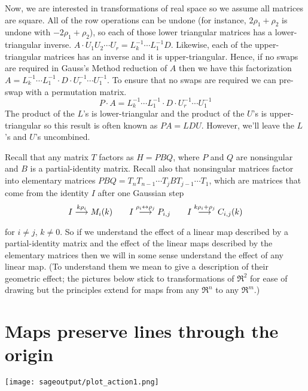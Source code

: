 Now, we are interested in transformations of real space so we assume all
matrices are square.
All of the row operations can be undone (for instance, $2\rho_1+\rho_2$
is undone with $-2\rho_1+\rho_2$), so each of those lower triangular matrices
has a lower-triangular inverse.
$A\cdot U_1U_2\cdots U_r = L_k^{-1}\cdots L_1^{-1}D$. 
Likewise, each of the upper-triangular matrices has an inverse and it is
upper-triangular.
Hence, if no swaps are required in Gauss's Method reduction of $A$ then we have
this factorization 
$A = L_k^{-1}\cdots L_1^{-1}\cdot D\cdot U_r^{-1}\cdots U_1^{-1}$.
To ensure that no swaps are required we can pre-swap with a permutation matrix.
\begin{equation*}
  P\cdot A = L_k^{-1}\cdots L_1^{-1}\cdot D\cdot U_r^{-1}\cdots U_1^{-1}
  \tag{$**$}
\end{equation*}
The product of the $L$'s is lower-triangular and the product of the
$U$'s is upper-triangular so this result is often known as $PA=LDU$.
However, we'll leave the $L$'s and $U$'s uncombined.

Recall that any matrix $T$ factors as $H=PBQ$, 
where $P$ and $Q$ are nonsingular and $B$ is a partial-identity matrix.
Recall also that nonsingular matrices
factor into elementary matrices
$PBQ=T_nT_{n-1}\cdots T_jBT_{j-1}\cdots T_1$,
which are matrices that
come from the identity $I$ after one Gaussian step
\begin{equation*}
  I\mathrel{ \mathop{\longrightarrow}\limits^{k\rho_i\mathstrut}_{ \begin{subarray}{l} \relax \end{subarray}}}M_i(k) 
  \qquad 
  I\mathrel{ \mathop{\longrightarrow}\limits^{\rho_i\leftrightarrow\rho_j\mathstrut}_{ \begin{subarray}{l} \relax \end{subarray}}}P_{i,j}  
  \qquad
  I\mathrel{ \mathop{\longrightarrow}\limits^{k\rho_i+\rho_j\mathstrut}_{ \begin{subarray}{l} \relax \end{subarray}}}C_{i,j}(k) 
\end{equation*}
for $i\neq j$, $k\neq 0$.
So if we understand the effect of a linear map described
by a partial-identity matrix and the effect of the linear maps
described by the elementary matrices then we will in some sense
understand the effect of any linear map.
(To understand them we mean to give a description of their geometric effect;
the pictures below stick to transformations of $\Re^2$ for ease of drawing
but the principles extend for maps from any $\Re^n$ to any $\Re^m$.)







\section{Maps preserve lines through the origin}







\begin{center}
  \texttt{[image: sageoutput/plot\_action1.png]}
\end{center}

\endinput


TODO:

